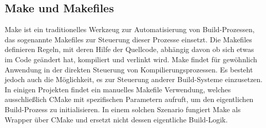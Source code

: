 \subsection{Make und Makefiles}
Make ist ein traditionelles Werkzeug zur Automatisierung von Build-Prozessen, das sogenannte Makefiles zur Steuerung dieser Prozesse einsetzt.
Die Makefiles definieren Regeln, mit deren Hilfe der Quellcode, abhängig davon ob sich etwas im Code geändert hat, kompiliert und verlinkt wird.
Make findet für gewöhnlich Anwendung in der direkten Steuerung von Kompilierungsprozessen.
 Es besteht jedoch auch die Möglichkeit, es zur Steuerung anderer Build-Systeme einzusetzen.
In einigen Projekten findet ein manuelles Makefile Verwendung, welches ausschließlich CMake mit spezifischen Parametern aufruft, um den eigentlichen Build-Prozess zu initialisieren.
In einem solchen Szenario fungiert Make als Wrapper über CMake und ersetzt nicht dessen eigentliche Build-Logik.






























